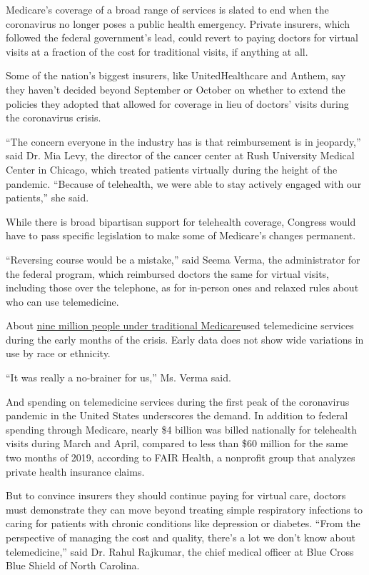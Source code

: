 Medicare's coverage of a broad range of services is slated to end when
the coronavirus no longer poses a public health emergency. Private
insurers, which followed the federal government's lead, could revert to
paying doctors for virtual visits at a fraction of the cost for
traditional visits, if anything at all.

Some of the nation's biggest insurers, like UnitedHealthcare and Anthem,
say they haven't decided beyond September or October on whether to
extend the policies they adopted that allowed for coverage in lieu of
doctors' visits during the coronavirus crisis.

``The concern everyone in the industry has is that reimbursement is in
jeopardy,'' said Dr. Mia Levy, the director of the cancer center at Rush
University Medical Center in Chicago, which treated patients virtually
during the height of the pandemic. ``Because of telehealth, we were able
to stay actively engaged with our patients,'' she said.

While there is broad bipartisan support for telehealth coverage,
Congress would have to pass specific legislation to make some of
Medicare's changes permanent.

``Reversing course would be a mistake,'' said Seema Verma, the
administrator for the federal program, which reimbursed doctors the same
for virtual visits, including those over the telephone, as for in-person
ones and relaxed rules about who can use telemedicine.

About
\href{https://www.healthaffairs.org/do/10.1377/hblog20200715.454789/full/}{nine
million people under traditional Medicare}used telemedicine services
during the early months of the crisis. Early data does not show wide
variations in use by race or ethnicity.

``It was really a no-brainer for us,'' Ms. Verma said.

And spending on telemedicine services during the first peak of the
coronavirus pandemic in the United States underscores the demand. In
addition to federal spending through Medicare, nearly \$4 billion was
billed nationally for telehealth visits during March and April, compared
to less than \$60 million for the same two months of 2019, according to
FAIR Health, a nonprofit group that analyzes private health insurance
claims.

But to convince insurers they should continue paying for virtual care,
doctors must demonstrate they can move beyond treating simple
respiratory infections to caring for patients with chronic conditions
like depression or diabetes. ``From the perspective of managing the cost
and quality, there's a lot we don't know about telemedicine,'' said Dr.
Rahul Rajkumar, the chief medical officer at Blue Cross Blue Shield of
North Carolina.

